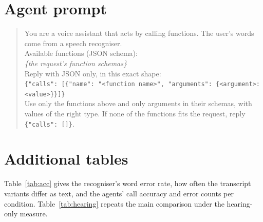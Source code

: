 \documentclass[11pt]{article}
\begin{document}
\section{Agent prompt}
\label{app:prompt}
\begin{quote}\small
You are a voice assistant that acts by calling functions. The user's words come from a speech recogniser.\\[2pt]
Available functions (JSON schema):\\
\textit{\{the request's function schemas\}}\\[2pt]
Reply with JSON only, in this exact shape:\\
\texttt{\{"calls": [\{"name": "<function name>", "arguments": \{<argument>: <value>\}\}]\}}\\
Use only the functions above and only arguments in their schemas, with values of the right type.
If none of the functions fits the request, reply \texttt{\{"calls": []\}}.
\end{quote}

\section{Additional tables}
Table~\ref{tab:acc} gives the recogniser's word error rate, how often the transcript variants differ as text, and the agents' call accuracy and error counts per condition. Table~\ref{tab:hearing} repeats the main comparison under the hearing-only measure.


\end{document}
